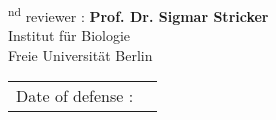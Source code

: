 \begin{supervisorpage}
\vspace{20pt} %

\textsuperscript{nd} reviewer : \textbf{Prof. Dr. Sigmar Stricker}\\
\hspace*{5.8em}Institut für Biologie\\
\hspace*{5.8em}Freie Universität Berlin



\vspace{2cm} %
\noindent
\begin{tabular}{rl}
Date of defense : & \\
\end{tabular}

\end{supervisorpage}